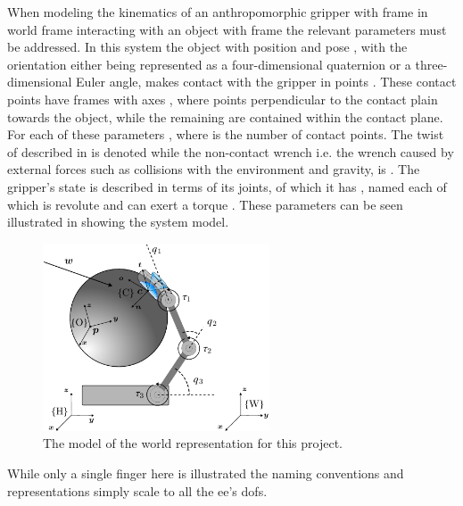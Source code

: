 When modeling the kinematics of an anthropomorphic gripper with frame  in world frame  interacting with an object with frame  the relevant parameters must be addressed. In this system the object with position  and pose , with the orientation either being represented as a four-dimensional quaternion or a three-dimensional Euler angle, makes contact with the gripper in points . These contact points have frames  with axes , where  points perpendicular to the contact plain towards the object, while the remaining are contained within the contact plane. For each of these parameters , where  is the number of contact points. The twist of  described in  is denoted  while the non-contact wrench i.e. the wrench caused by external forces such as collisions with the environment and gravity, is . The gripper's state is described in terms of its joints, of which it has , named  each of which is revolute and can exert a torque . These parameters can be seen illustrated in  showing the system model.
%
\begin{figure}[h]
	\begin{small}
		\begin{center}
			\includegraphics[width=0.6\textwidth]{chapters/modeling/fig/sys-schematic-reversed-crop.pdf}
		\end{center}
		\caption{The model of the world representation for this project.}
		\label{fig:sys-schematic}
	\end{small}
\end{figure}
%
While only a single finger here is illustrated the naming conventions and representations simply scale to all the \gls{ee}'s \gls{dof}s.\medskip

